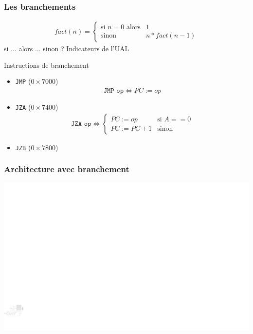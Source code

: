 \documentclass{beamer}
\begin{document}
\begin{frame}
\frametitle{Les branchements}
\begin{eqnarray*}
fact(n) = \begin{cases}
\mbox{si } n=0 \mbox{ alors}& 1\\
\mbox{sinon }& n * fact(n-1)
\end{cases}
\end{eqnarray*}
si ... alors ... sinon ? Indicateurs de l'UAL
\begin{block}{Instructions de branchement}
\begin{footnotesize}
\begin{itemize}
\item \texttt{JMP} ($0\times7000$)
\begin{eqnarray*}
\texttt{JMP op} \Leftrightarrow PC := op
\end{eqnarray*}
\item \texttt{JZA}  ($0\times7400$)
\begin{eqnarray*}
\texttt{JZA op}  \Leftrightarrow \begin{cases}
PC := op & \mbox{si } A==0\\
PC := PC+1 & \mbox{sinon}
\end{cases}
\end{eqnarray*}
\item \texttt{JZB}  ($0\times7800$)
\end{itemize}
\end{footnotesize}
\end{block}

\end{frame}

\begin{frame}
\frametitle{Architecture avec branchement}
\centering\includegraphics[width=\linewidth]{Figs/premier_chemin_seq_jmp.pdf}
\end{frame}
\end{document}
